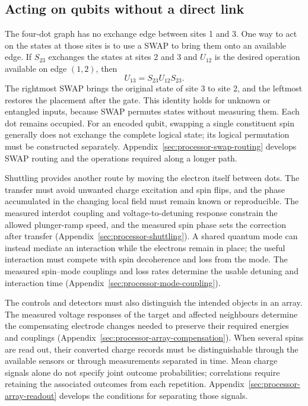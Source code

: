 \subsection{Acting on qubits without a direct link}

The four-dot graph has no exchange edge between sites 1 and 3.
One way to act on the states at those sites is to use a SWAP to
bring them onto an available edge. If $S_{23}$ exchanges the
states at sites 2 and 3 and $U_{12}$ is the desired operation
available on edge $(1,2)$, then
\begin{equation}
 U_{13}=S_{23}U_{12}S_{23}.
 \label{eq:platform-routed-gate}
\end{equation}
The rightmost SWAP brings the original state of site 3 to site 2,
and the leftmost restores the placement after the gate. This
identity holds for unknown or entangled inputs, because SWAP
permutes states without measuring them. Each dot remains occupied.
For an encoded qubit, swapping a single constituent spin generally
does not exchange the complete logical state; its logical
permutation must be constructed separately.
Appendix~\ref{sec:processor-swap-routing} develops SWAP routing
and the operations required along a longer path.

Shuttling provides another route by moving the electron itself
between dots. The transfer must avoid unwanted charge excitation
and spin flips, and the phase accumulated in the changing local
field must remain known or reproducible. The measured interdot
coupling and voltage-to-detuning response constrain the allowed
plunger-ramp speed, and the measured spin
phase sets the correction after transfer
(Appendix~\ref{sec:processor-shuttling}).
A shared quantum mode
can instead mediate an interaction while the electrons remain in
place; the useful interaction must compete with spin decoherence
and loss from the mode. The measured spin--mode couplings and loss
rates determine the usable detuning and interaction time
(Appendix~\ref{sec:processor-mode-coupling}).

The controls and detectors must also distinguish the intended
objects in an array. The measured voltage responses of the target
and affected neighbours determine the compensating electrode
changes needed to preserve their required energies and couplings
(Appendix~\ref{sec:processor-array-compensation}).
When several spins are read out, their converted charge
records must be distinguishable through the available sensors or
through measurements separated in time. Mean charge signals alone
do not specify joint outcome probabilities; correlations require
retaining the associated outcomes from each repetition.
Appendix~\ref{sec:processor-array-readout} develops the conditions
for separating those signals.
